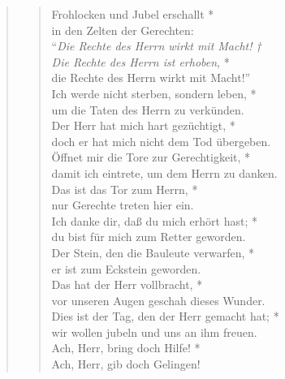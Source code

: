 \medskip

\def\greinitialformat#1{{\fontsize{40}{40}\selectfont #1}}
\gresetfirstlineaboveinitial{\small \textcolor{red}{ Ps 118b}}{}
\setaboveinitialseparation{0.72mm}


\medskip




\begin{quote}
\begin{verse}

Frohlocken und Jubel erschallt *\\
in den Zelten der Gerechten:\\
\vin ``\textit{Die Rechte des Herrn wirkt mit Macht! †\\
\vin Die Rechte des Herrn ist erhoben}, *\\
\vin die Rechte des Herrn wirkt mit Macht!''\\
Ich werde nicht sterben, sondern leben, *\\
um die Taten des Herrn zu verkünden.\\
\vin Der Herr hat mich hart gezüchtigt, *\\
\vin doch er hat mich nicht dem Tod übergeben.\\
Öffnet mir die Tore zur Gerechtigkeit, *\\
damit ich eintrete, um dem Herrn zu danken.\\
\vin Das ist das Tor zum Herrn, *\\
\vin nur Gerechte treten hier ein.\\
Ich danke dir, daß du mich erhört hast; *\\
du bist für mich zum Retter geworden.\\
\vin Der Stein, den die Bauleute verwarfen, *\\
\vin er ist zum Eckstein geworden.\\
Das hat der Herr vollbracht, *\\
vor unseren Augen geschah dieses Wunder.\\
\vin Dies ist der Tag, den der Herr gemacht hat; *\\
\vin wir wollen jubeln und uns an ihm freuen.\\
Ach, Herr, bring doch Hilfe! *\\
Ach, Herr, gib doch Gelingen!\\

\end{verse}
\end{quote}
